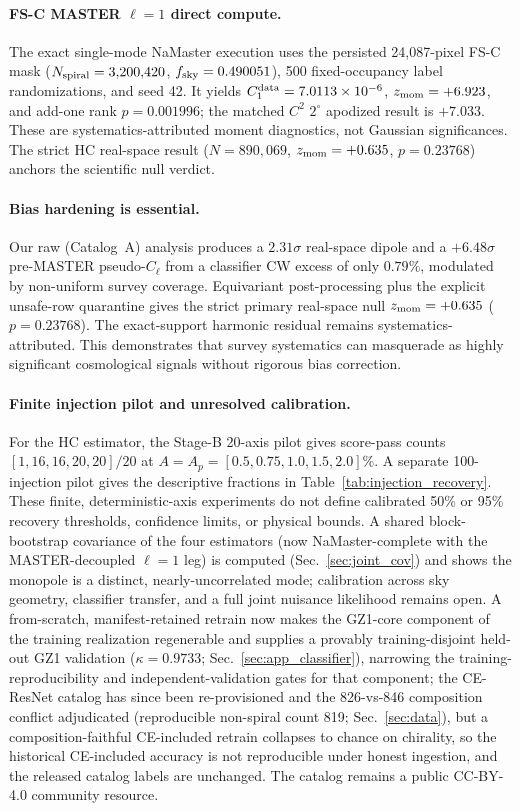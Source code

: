 \documentclass[twocolumn,linenumbers]{aastex702}
\newcommand{\sigmaunit}{\sigma}
\newcommand{\FSC}{\textsc{FS-C}}
\begin{document}
\paragraph{\FSC{} MASTER $\ell\!=\!1$ direct compute.}
The exact single-mode NaMaster execution uses the persisted 24,087-pixel \FSC{} mask ($N_{\rm spiral}=3{,}200{,}420$, $f_{\rm sky}=0.490051$), 500 fixed-occupancy label randomizations, and seed 42. It yields $C_1^{\rm data}=7.0113\times10^{-6}$, $z_{\rm mom}=+6.923$, and add-one rank $p=0.001996$; the matched $C^2$ $2^\circ$ apodized result is $+7.033$. These are systematics-attributed moment diagnostics, not Gaussian significances. The strict HC real-space result ($N=890{,}069$, $z_{\rm mom}=+0.635$, $p=0.23768$) anchors the scientific null verdict.

\paragraph{Bias hardening is essential.}
Our raw (Catalog~A) analysis produces a $2.31\sigmaunit$ real-space dipole and a $+6.48\sigmaunit$ pre-MASTER pseudo-$C_\ell$ from a classifier CW excess of only $0.79\%$, modulated by non-uniform survey coverage. Equivariant post-processing plus the explicit unsafe-row quarantine gives the strict primary real-space null $z_{\rm mom}=+0.635$ ($p=0.23768$). The exact-support harmonic residual remains systematics-attributed. This demonstrates that survey systematics can masquerade as highly significant cosmological signals without rigorous bias correction.

\paragraph{Finite injection pilot and unresolved calibration.}
For the HC estimator, the Stage-B 20-axis pilot gives score-pass counts $[1,16,16,20,20]/20$ at $A=A_p=[0.5,0.75,1.0,1.5,2.0]\%$. A separate 100-injection pilot gives the descriptive fractions in Table~\ref{tab:injection_recovery}. These finite, deterministic-axis experiments do not define calibrated 50\% or 95\% recovery thresholds, confidence limits, or physical bounds. A shared block-bootstrap covariance of the four estimators (now NaMaster-complete with the MASTER-decoupled $\ell=1$ leg) is computed (Sec.~\ref{sec:joint_cov}) and shows the monopole is a distinct, nearly-uncorrelated mode; calibration across sky geometry, classifier transfer, and a full joint nuisance likelihood remains open. A from-scratch, manifest-retained retrain now makes the GZ1-core component of the training realization regenerable and supplies a provably training-disjoint held-out GZ1 validation ($\kappa=0.9733$; Sec.~\ref{sec:app_classifier}), narrowing the training-reproducibility and independent-validation gates for that component; the CE-ResNet catalog has since been re-provisioned and the 826-vs-846 composition conflict adjudicated (reproducible non-spiral count 819; Sec.~\ref{sec:data}), but a composition-faithful CE-included retrain collapses to chance on chirality, so the historical CE-included accuracy is not reproducible under honest ingestion, and the released catalog labels are unchanged. The catalog remains a public CC-BY-4.0 community resource.
\end{document}
